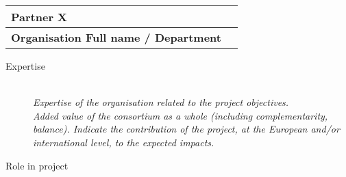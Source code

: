 %

\begin{center}
    \begin{tabular}{|p{}|l|}
        \hline
        \textbf{Partner X} & \\\hline
        \textbf{Organisation Full name / Department} &  \\
        \hline
    \end{tabular}    
\end{center}

\begin{description}
  \item[Expertise]~\\
    \emph{Expertise of the organisation related to the project objectives.}\\
    
    \emph{Added value of the consortium as a whole (including
  complementarity, balance). Indicate the contribution of the project, at the
  European and/or international level, to the expected impacts.} 

    
  \item[Role in project]~\\


    
\end{description}


%
